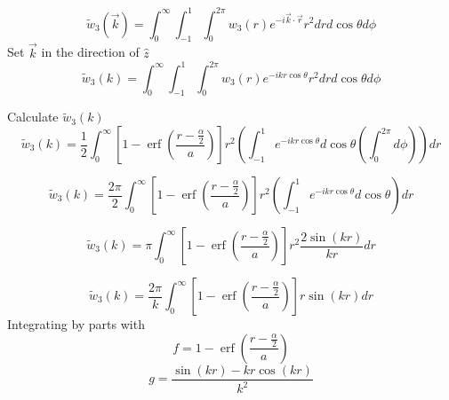 \documentclass[double,12pt]{beavtex}
\begin{document}
\begin{equation}{\widetilde{w}_3(\vec{k})=\int_{0}^{\infty}\int_{-1}^{1}\int_{0}^{2\pi}w_3(r)e^{-i\vec{k}\cdot{\vec{r}}}r^2d{r}d{\cos\theta}d{\phi}}\end{equation}
Set $\vec{k}$ in the direction of $\hat{z}$ 
\begin{equation}{\widetilde{w}_3(k)=\int_{0}^{\infty}\int_{-1}^{1}\int_{0}^{2\pi}w_3(r)e^{-ikr\cos\theta}r^2d{r}d{\cos\theta}d{\phi}}\end{equation}

\noindent Calculate $\widetilde{w}_3(k)$ 
\begin{equation}{\widetilde{w}_3(k)=\frac{1}{2}\int_{0}^{\infty}\left[1-\operatorname{erf}\left(\frac{r-\frac{\alpha}{2}}{a}\right)\right]r^2\left(\int_{-1}^{1}e^{-ikr\cos\theta}d{\cos\theta}\left(\int_{0}^{2\pi}d{\phi}\right)\right)d{r}}\end{equation}
\[{}\]

\begin{equation}{\widetilde{w}_3(k)=\frac{2\pi}{2}\int_{0}^{\infty}\left[1-\operatorname{erf}\left(\frac{r-\frac{\alpha}{2}}{a}\right)\right]r^2\left(\int_{-1}^{1}e^{-ikr\cos\theta}d{\cos\theta}\right)d{r}}\end{equation}

\begin{equation}{\widetilde{w}_3(k)=\pi\int_{0}^{\infty}\left[1-\operatorname{erf}\left(\frac{r-\frac{\alpha}{2}}{a}\right)\right]r^2\frac{2\sin(kr)}{kr}d{r}}\end{equation}

\begin{equation}{\widetilde{w}_3(k)=\frac{2\pi}{k}\int_{0}^{\infty}\left[1-\operatorname{erf}\left(\frac{r-\frac{\alpha}{2}}{a}\right)\right]r\sin(kr)d{r}}\end{equation}
Integrating by parts with 
\begin{displaymath}{f=1-\operatorname{erf}\left(\frac{r-\frac{\alpha}{2}}{a}\right)}\end{displaymath}
\begin{displaymath}{g=\frac{\sin(kr)-kr\cos(kr)}{k^2}}\end{displaymath}
\end{document}
